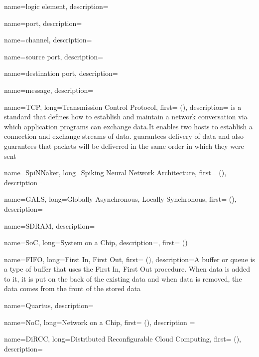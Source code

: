 {
	name={logic element},
    description={}
}

{
	name={port},
    description={}
}

{
	name={channel},
    description={}
}

{
	name={source port},
    description={}
}

{
	name={destination port},
    description={}
}

{
	name={message},
    description={}
}

{
	name={TCP},
    long={Transmission Control Protocol},
    first={} (),
    description={ is a standard that defines how to establish and maintain a network conversation via which application programs can exchange data.It  enables two hosts to establish a connection and exchange streams of data.  guarantees delivery of data and also guarantees that packets will be delivered in the same order in which they were sent}
}

{
	name={SpiNNaker},
    long={Spiking Neural Network Architecture},
    first={} (),
    description={}
}

{
	name={GALS},
    long={Globally Asynchronous, Locally Synchronous},
    first={} (),
    description={}
}

{
	name={SDRAM},
    description={}
}

{
	name={SoC},
    long={System on a Chip},
    description={},
    first={} ()
}

{
	name={FIFO},
    long={First In, First Out},
    first={} (),
    description={A  buffer or queue is a type of buffer that uses the First In, First Out procedure. When data is added to it, it is put on the back of the existing data and when data is removed, the data comes from the front of the stored data}
}

{
	name={Quartus},
    description={}
}

{
	name={NoC},
    long={Network on a Chip},
    first={} (),
    description ={}
}

{
	name={DiRCC},
    long={Distributed Reconfigurable Cloud Computing},
    first={} (),
    description={}
}
